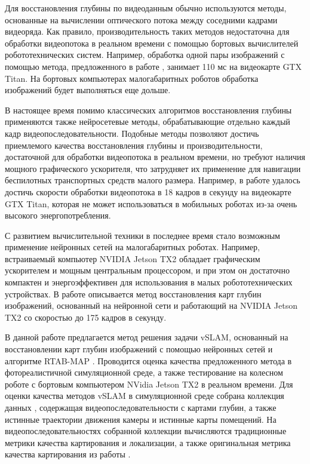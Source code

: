 \documentclass{mipt-thesis-ms}
\begin{document}
	Для восстановления глубины по видеоданным обычно используются методы, основанные на вычислении оптического потока между соседними кадрами видеоряда. Как правило, производительность таких методов недостаточна для обработки видеопотока в реальном времени с помощью бортовых вычислителей робототехнических систем. Например, обработка одной пары изображений с помощью метода, предложенного в работе \cite{ummenhofer2017demon}, занимает 110 мс на видеокарте GTX Titan. На бортовых компьютерах малогабаритных роботов обработка изображений будет выполняться еще дольше.
	
	В настоящее время помимо классических алгоритмов восстановления глубины применяются также нейросетевые методы, обрабатывающие отдельно каждый кадр видеопоследовательности. Подобные методы позволяют достичь приемлемого качества восстановления глубины  и производительности, достаточной для обработки видеопотока в реальном времени, но требуют наличия мощного графического ускорителя, что затрудняет их применение для навигации беспилотных транспортных средств малого размера. Например, в работе \cite{laina2016deeper} удалось достичь скорости обработки видеопотока в 18 кадров в секунду на видеокарте GTX Titan, которая не может использоваться в мобильных роботах из-за очень высокого энергопотребления.
	
	С развитием вычислительной техники в последнее время стало возможным применение нейронных сетей на малогабаритных роботах. Например, встраиваемый компьютер NVIDIA Jetson TX2 \cite{franklin2017nvidia} обладает графическим ускорителем и мощным центральным процессором, и при этом он достаточно компактен и энергоэффективен для использования в малых робототехнических устройствах. В работе \cite{wofk2019fastdepth} описывается метод восстановления карт глубин изображений, основанный на нейронной сети и работающий на NVIDIA Jetson TX2 со скоростью до 175 кадров в секунду.
	
	В данной работе предлагается метод решения задачи vSLAM, основанный на восстановлении карт глубин изображений с помощью нейронных сетей и алгоритме RTAB-MAP \cite{labbe2019rtab}. Проводится оценка качества предложенного метода в фотореалистичной симуляционной среде, а также тестирование на колесном роботе с бортовым компьютером NVidia Jetson TX2 в реальном времени. Для оценки качества методов vSLAM в симуляционной среде собрана коллекция данных \cite{bokovoy2021maomaps}, содержащая видеопоследовательности с картами глубин, а также истинные траектории движения камеры и истинные карты помещений. На видеопоследовательностях собранной коллекции вычисляются традиционные метрики качества картирования и локализации, а также оригинальная метрика качества картирования из работы \cite{bokovoy2021assessment}.
	
\end{document}
